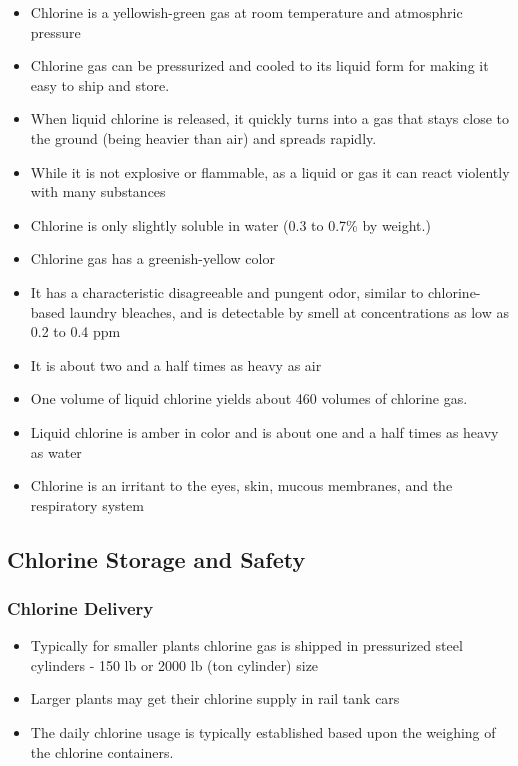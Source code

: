 \begin{itemize}
\item Chlorine is a yellowish-green gas at room temperature and atmosphric pressure
\item Chlorine gas can be pressurized and cooled to its liquid form for making it easy to ship and store. 
\item When liquid chlorine is released, it quickly turns into a gas that stays close to the ground (being heavier than air) and spreads rapidly.
	\item 	While it is not explosive or flammable, as a liquid or gas it can react violently with many substances 
	\item Chlorine is only slightly soluble in water (0.3 to 0.7\% by weight.) 
	\item Chlorine gas has a greenish-yellow color 
	\item It has a characteristic disagreeable and pungent odor, similar to chlorine-based laundry bleaches, and is detectable by smell at concentrations as low as 0.2 to 0.4 ppm
	\item It is about two and a half times as heavy as air
	\item One volume of liquid chlorine yields about 460 volumes of chlorine gas. 
	\item Liquid chlorine is amber in color and is about one and a half times as heavy as water 
	\item Chlorine is an irritant to the eyes, skin, mucous membranes, and the respiratory system 
\end{itemize}


\subsection{Chlorine Storage and Safety}


\subsubsection{Chlorine Delivery}

\begin{itemize}
\item Typically for smaller plants chlorine gas is shipped in  pressurized steel cylinders - 150 lb or 2000 lb (ton cylinder) size
\item Larger plants may get their chlorine supply in rail tank cars
\item The daily chlorine usage is typically established based upon the weighing of the chlorine containers.
\end{itemize}


